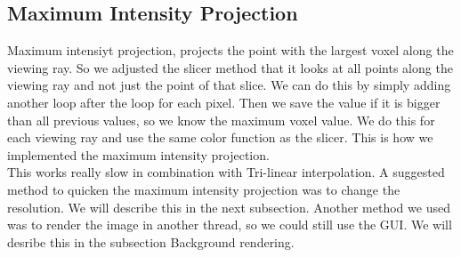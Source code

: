 \subsection{Maximum Intensity Projection}
Maximum intensiyt projection, projects the point with the largest voxel along the viewing ray. 
So we adjusted the slicer method that it looks at all points along the viewing ray and not just the point of that slice. 
We can do this by simply adding another loop after the loop for each pixel. 
Then we save the value if it is bigger than all previous values, so we know the maximum voxel value.
We do this for each viewing ray and use the same color function as the slicer. 
This is how we implemented the maximum intensity projection. \\
 This works really slow in combination with Tri-linear interpolation.
 A suggested method to quicken the maximum intensity projection was to change the resolution. 
 We will describe this in the next subsection. 
 Another method we used was to render the image in another thread, so we could still use the GUI.
We will desribe this in the subsection Background rendering.
